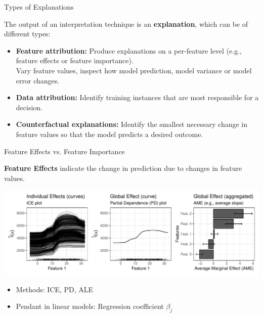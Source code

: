 \documentclass[11pt,compress,t,notes=noshow, aspectratio=169, xcolor=table]{beamer}
\begin{document}
\begin{frame}{Types of Explanations}

	The output of an interpretation technique is an \textbf{explanation}, which can be of different types:

    \medskip

	\begin{itemize}
  \itemsep1em
	\item
		\textbf{Feature attribution:} Produce explanations on a per-feature level (e.g., feature effects or feature importance).
		\\
		Vary feature values, inspect how model prediction, model variance or model error changes.

	\item
		\textbf{Data attribution:}
		Identify training instances that are most responsible for a decision.

	\item
	   \textbf{Counterfactual explanations:}
	   Identify the smallest necessary change in feature values so that the model predicts a desired outcome.
	   \\

	\end{itemize}

\end{frame}



\begin{frame}{Feature Effects vs. Feature Importance}

	\textbf{Feature Effects} indicate the change in prediction due to changes in feature values.
	\medskip
	\begin{center}
		\includegraphics[page=1, width=\textwidth]{figure/feature-effect}
	\end{center}
	\begin{itemize}
		\item Methods: ICE, PD, ALE
		\item Pendant in linear models: Regression coefficient $\beta_j$
	\end{itemize}
\end{frame}
\end{document}
